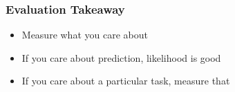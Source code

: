 \begin{frame}
  \frametitle{Evaluation Takeaway}

  \begin{itemize}
    \item Measure what you care about~\cite{chang-09c}
      \item If you care about prediction, likelihood is good
\item If you care about a particular task, measure that
    \end{itemize}

\end{frame}

\fi
